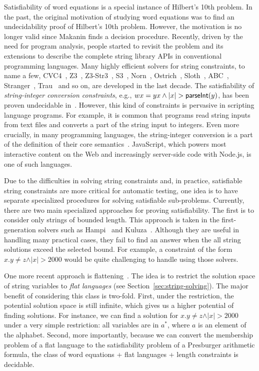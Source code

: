 Satisfiability of word equations is a special instance of Hilbert’s 10th problem. 
In the past, the original motivation of studying word equations was to find an undecidability proof of Hilbert’s 10th problem. 
However, the motivation is no longer valid since Makanin finds a decision procedure. Recently, driven by the need for program analysis, people started to revisit the problem and its extensions to describe the complete string library APIs in conventional programming languages. Many highly efficient solvers for string constraints, to name a few, CVC4~\cite{cvc4Tool}, Z3~\cite{z3}, Z3-Str3~\cite{zheng2013z3}, S3~\cite{trinh2014s3}, Norn~\cite{abdulla2015norn}, Ostrich~\cite{chen2017decidable}, Sloth~\cite{sloth}, ABC~\cite{aydin2018parameterized}, Stranger~\cite{yu2010stranger}, Trau~\cite{abdulla2018trau} and so on, are developed in the last decade.
The satisfiability of \emph{string-integer conversion constraints}, e.g., $wx=yx \wedge \vert x\vert  > \textsf{parseInt}(y)$, has been proven undecidable in~\cite{DayGHMN18}. 
However, this kind of constraints is pervasive in scripting language programs. 
For example, it is common that programs read string inputs from text files and converts a part of the string input to integers.
Even more crucially, in many programming languages, the string-integer conversion is a part of the definition of their core semantics~\cite{ecmascript2019ecmascript}. 
JavaScript, which powers most interactive content on the Web and increasingly server-side code with Node.js, is one of such languages. 

Due to the difficulties in solving string constraints and, in practice, satisfiable string constraints are more critical for automatic testing, one idea is to have separate specialized procedures for solving satisfiable sub-problems. 
Currently, there are two main specialized approaches for proving satisfiability.
The first is to consider only strings of bounded length.
This approach is taken in the first-generation solvers such as Hampi~\cite{KiezunGAGHE12} and Kuluza~\cite{SaxenaAHMMS10}.
Although they are useful in handling many practical cases, they fail to find an answer when the all string solutions exceed the selected bound.
For example, a constraint of the form $x.y \neq z  \wedge \vert x\vert  > 2000$ would be quite challenging to handle using those solvers.

One more recent approach is flattening~\cite{Parosh:20:PLDI,AbdullaACDHRR18,AbdullaACDHRR17}.
The idea is to restrict the solution space of string variables to 
\emph{flat languages} (see Section~\ref{sec:string-solving}). 
The major benefit of considering this class is two-fold.
First, under the restriction, the potential solution space is still infinite, which gives us a higher potential of finding solutions.
For instance, we can find a solution for $x.y \neq z  \wedge \vert x\vert  > 2000$ under a very simple restriction: all variables are in $a^*$, where $a$ is an element of the alphabet.
Second, more importantly, because we can convert the membership problem of a flat language to the satisfiability problem of a Presburger arithmetic formula, the class of word equations + flat languages + length constraints is decidable.

